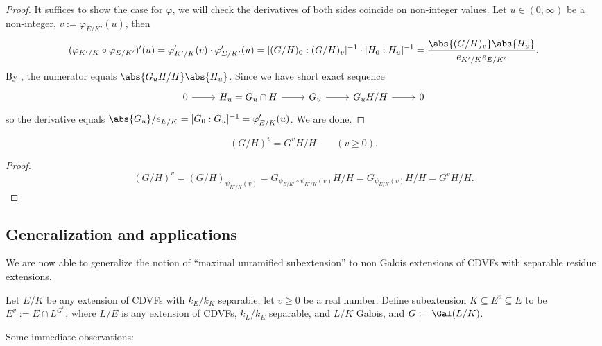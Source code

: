 \documentclass[11pt]{amsart}
\begin{document}
\begin{proof}
    It suffices to show the case for $\varphi$, we will check the derivatives of
    both sides coincide on non-integer values.  Let $u \in (0, \infty)$ be a
    non-integer, $v := \varphi_{E/K'}(u)$, then
    \[
        (\varphi_{K'/K} \circ \varphi_{E/K'})'(u)
        = \varphi_{K'/K}'(v) \cdot \varphi_{E/K'}'(u)
        = [(G/H)_0 : (G/H)_v]^{-1} \cdot [H_0 : H_u]^{-1}
        = \frac{\abs{(G/H)_v} \abs{H_u}}{e_{K'/K} e_{E/K'}}.
    \]
    By , the numerator equals $\abs{G_u H / H} \abs{H_u}$.
    Since we have short exact sequence
    \[
      \begin{tikzcd}
         0 \rar & H_u = G_u \cap H \rar & G_u \rar & G_u H / H \rar & 0
      \end{tikzcd}
    \]
    so the derivative equals $\abs{G_u}/e_{E/K} = [G_0 : G_u]^{-1} =
    \varphi_{E/K}'(u)$. We are done.
\end{proof}

\begin{cor}
    \[
        (G/H)^v = G^v H/H \qquad (v \geq 0).
    \]
\end{cor}

\begin{proof}
    \[
        (G/H)^v = (G/H)_{\psi_{K'/K}(v)}
        = G_{\psi_{E/K'} \circ \psi_{K'/K}(v)} H / H
        = G_{\psi_{E/K}(v)} H / H
        = G^v H / H.
    \]
\end{proof}


\subsection{Generalization and applications}

We are now able to generalize the notion of ``maximal unramified subextension''
to non Galois extensions of CDVFs with separable residue extensions.

\begin{defn}
    Let $E/K$ be any extension of CDVFs with $k_E/k_K$ separable, let $v \geq 0$
    be a real number.   Define subextension $K \subseteq E^v \subseteq E$ to be
    $E^v := E \cap L^{G^v}$, where $L/E$ is any extension of CDVFs, $k_L/k_E$
    separable, and $L/K$ Galois, and $G := \Gal(L/K)$.
\end{defn}

Some immediate observations:
\end{document}
